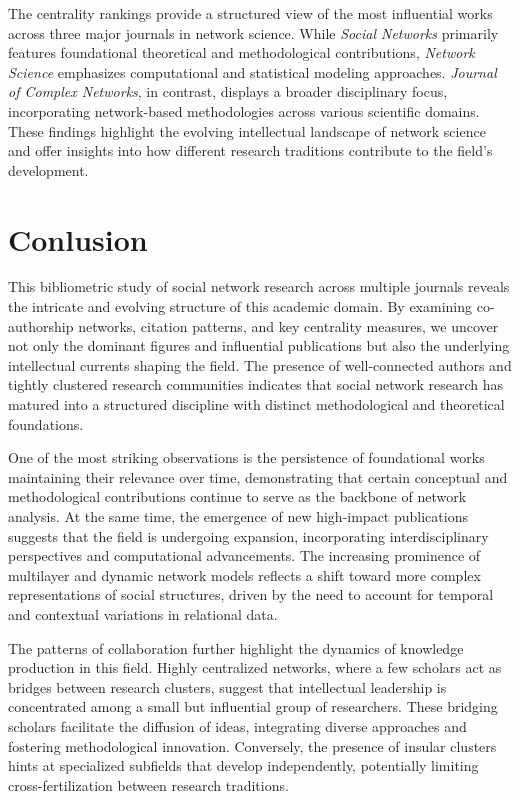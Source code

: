 \documentclass[twocolumn]{article}
\begin{document}
		The centrality rankings provide a structured view of the most influential works across three major journals in network science. While \textit{Social Networks} primarily features foundational theoretical and methodological contributions, \textit{Network Science} emphasizes computational and statistical modeling approaches. \textit{Journal of Complex Networks}, in contrast, displays a broader disciplinary focus, incorporating network-based methodologies across various scientific domains. These findings highlight the evolving intellectual landscape of network science and offer insights into how different research traditions contribute to the field’s development. 
		
		\section{Conlusion}
		
		This bibliometric study of social network research across multiple journals reveals the intricate and evolving structure of this academic domain. By examining co-authorship networks, citation patterns, and key centrality measures, we uncover not only the dominant figures and influential publications but also the underlying intellectual currents shaping the field. The presence of well-connected authors and tightly clustered research communities indicates that social network research has matured into a structured discipline with distinct methodological and theoretical foundations.
		
		One of the most striking observations is the persistence of foundational works maintaining their relevance over time, demonstrating that certain conceptual and methodological contributions continue to serve as the backbone of network analysis. At the same time, the emergence of new high-impact publications suggests that the field is undergoing expansion, incorporating interdisciplinary perspectives and computational advancements. The increasing prominence of multilayer and dynamic network models reflects a shift toward more complex representations of social structures, driven by the need to account for temporal and contextual variations in relational data.
		
		The patterns of collaboration further highlight the dynamics of knowledge production in this field. Highly centralized networks, where a few scholars act as bridges between research clusters, suggest that intellectual leadership is concentrated among a small but influential group of researchers. These bridging scholars facilitate the diffusion of ideas, integrating diverse approaches and fostering methodological innovation. Conversely, the presence of insular clusters hints at specialized subfields that develop independently, potentially limiting cross-fertilization between research traditions.
		
\end{document}

